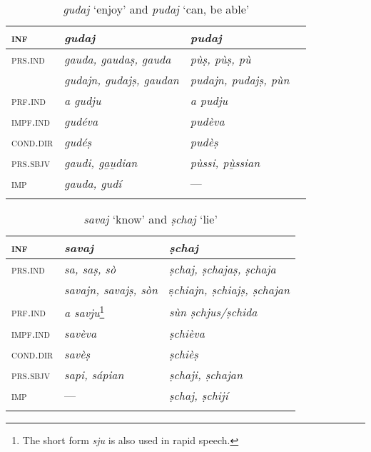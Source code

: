 \begin{table}
	\caption{\textit{gudaj} `enjoy' and \textit{pudaj} `can, be able'}

	\begin{tabular}{llll}
		\lsptoprule
		\textsc{inf} & \textbf{\textit{gudaj}} & \textit{\textbf{pudaj}} \\
		\midrule
		\textsc{prs.ind} & \textit{gauda, gaudaṣ, gauda} & \textit{pùṣ, pùṣ, pù}\\
		& \textit{gudajn, gudajṣ, gaudan} & \textit{pudajn, pudajṣ, pùn}\\
		\textsc{prf.ind} & \textit{a gudju} & \textit{a pudju}\\
		\textsc{impf.ind} & \textit{gudéva} & \textit{pudèva}\\
		\textsc{cond.dir} & \textit{gudéṣ} & \textit{pudèṣ}\\
		\textsc{prs.sbjv} &\textit{gaudi, ga̱u̱dian} & \textit{pùssi, pù̱ssian}\\
		\textsc{imp} & \textit{gauda, gudí} & ---\\
		\lspbottomrule
	\end{tabular}
\end{table}


\begin{table}
	\caption{\textit{savaj} `know' and \textit{ṣchaj} `lie'}

	\begin{tabular}{lll}
		\lsptoprule
		\textsc{inf} & \textbf{\textit{savaj}} & \textbf{\textit{ṣchaj}} \\
		\midrule
		\textsc{prs.ind} & \textit{sa, saṣ, sò} &  \textit{ṣchaj, ṣchajaṣ, ṣchaja} \\
		& \textit{savajn, savajṣ, sòn} & ṣ\textit{chiajn, ṣchiajṣ, ṣchajan} \\
		\textsc{prf.ind} & \textit{a savju}\footnote{The short form \textit{sju} is also used in rapid speech.} & \textit{sùn ṣchjus/ṣchida}\\
		\textsc{impf.ind} & \textit{savèva} & \textit{ṣchièva}\\
		\textsc{cond.dir} & \textit{savèṣ} & \textit{ṣchièṣ}\\
		\textsc{prs.sbjv} & \textit{sapi, sápian} & \textit{ṣchaji, ṣchajan}\\
		\textsc{imp} & --- & \textit{ṣchaj, ṣchijí}\\
		\lspbottomrule
	\end{tabular}
\end{table}



